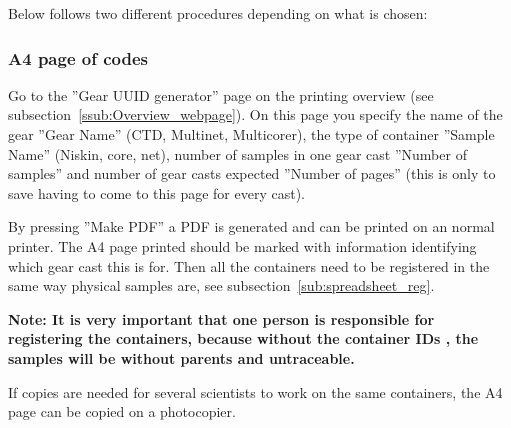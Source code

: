 \documentclass[a4paper,english, 11pt]{article}
\begin{document}
Below follows two different procedures depending on what is chosen:

\subsubsection{A4 page of codes} %
\label{ssub:A4_page}

Go to the ''Gear UUID generator'' page on the printing overview (see subsection~\ref{ssub:Overview_webpage}). 
On this page you specify the name of the gear ''Gear Name'' (CTD, Multinet, Multicorer), the type of container ''Sample Name'' (Niskin, core, net), number of samples in one gear cast ''Number of samples'' and number of gear casts expected ''Number of pages'' (this is only to save having to come to this page for every cast). 

By pressing ''Make PDF'' a PDF is generated and can be printed on an normal printer. The A4 page printed should be marked with information identifying which gear cast this is for. Then all the containers need to be registered in the same way physical samples are, see subsection~\ref{sub:spreadsheet_reg}.

\textbf{Note: It is very important that one person is responsible for registering the containers, because without the container IDs , the samples will be without parents and untraceable.}

If copies are needed for several scientists to work on the same containers, the A4 page can be copied on a photocopier. 
\end{document}
